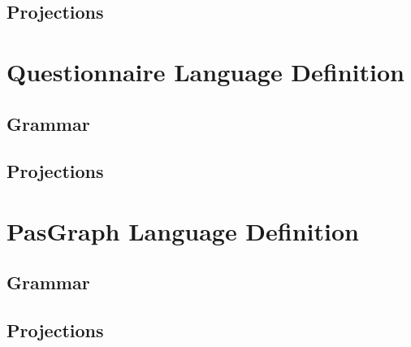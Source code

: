 \subsection{Projections}\label{expressionLanguageDefEditor}


\section{Questionnaire Language Definition}\label{questionnaireLanguageDef}

\subsection{Grammar}


\subsection{Projections}\label{questionnaireLanguageDefEditor}



\section{PasGraph Language Definition}\label{pascalLanguageDef}

\subsection{Grammar}


\subsection{Projections}\label{pascalLanguageDefEditor}






